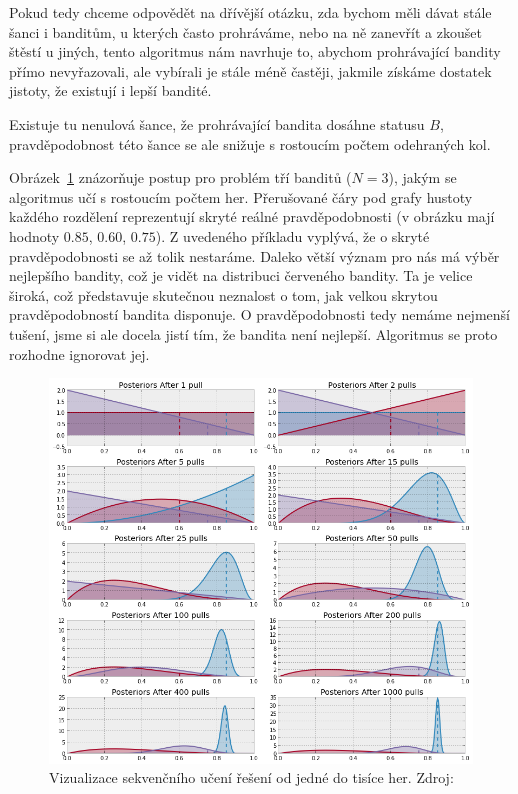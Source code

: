 \documentclass[thesis=M,czech]{FITthesis}[2014/05/07]
\begin{document}
Pokud tedy chceme odpovědět na dřívější otázku, zda bychom měli dávat stále šanci i banditům, u kterých často prohráváme, nebo na ně zanevřít a zkoušet štěstí u jiných, tento algoritmus nám navrhuje to, abychom prohrávající bandity přímo nevyřazovali, ale vybírali je stále méně častěji, jakmile získáme dostatek jistoty, že existují i lepší bandité. 

Existuje tu nenulová šance, že prohrávající bandita dosáhne statusu $B$, pravděpodobnost této šance se ale snižuje s rostoucím počtem odehraných kol. 

Obrázek~\ref{fig:posteriors} znázorňuje postup pro problém tří banditů ($N = 3$), jakým se algoritmus učí s rostoucím počtem her. Přerušované čáry pod grafy hustoty každého rozdělení reprezentují skryté reálné pravděpodobnosti (v obrázku mají hodnoty $0.85$, $0.60$, $0.75$). Z uvedeného příkladu vyplývá, že o skryté pravděpodobnosti se až tolik nestaráme. Daleko větší význam pro nás má výběr nejlepšího bandity, což je vidět na distribuci červeného bandity. Ta je velice široká, což představuje skutečnou neznalost o tom, jak velkou skrytou pravděpodobností bandita disponuje. O pravděpodobnosti tedy nemáme nejmenší tušení, jsme si ale docela jistí tím, že bandita není nejlepší. Algoritmus se proto rozhodne ignorovat jej.

\begin{figure}\centering
	\includegraphics[width=1.0\textwidth]{obr/posteriors.png}
 	\caption[Vizualizace sekvenčního učení řešení od jedné do tisíce her.]{Vizualizace sekvenčního učení řešení od jedné do tisíce her. Zdroj: \cite{camdp}}\label{fig:posteriors}
\end{figure}	
\end{document}
